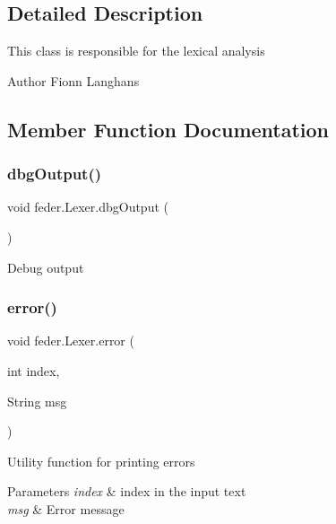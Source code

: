 \subsection{Detailed Description}
This class is responsible for the lexical analysis

\begin{DoxyAuthor}{Author}
Fionn Langhans 
\end{DoxyAuthor}


\subsection{Member Function Documentation}
\mbox{\label{classfeder_1_1Lexer_a523ea1024fa914eb932a2048f8201aa8}} 
\subsubsection{\texorpdfstring{dbg\+Output()}{dbgOutput()}}
{\footnotesize\ttfamily void feder.\+Lexer.\+dbg\+Output (\begin{DoxyParamCaption}{ }\end{DoxyParamCaption})}

Debug output \mbox{\label{classfeder_1_1Lexer_abd8b18eca822366aa2d9668b9991346b}} 
\subsubsection{\texorpdfstring{error()}{error()}}
{\footnotesize\ttfamily void feder.\+Lexer.\+error (\begin{DoxyParamCaption}\item[{int}]{index,  }\item[{String}]{msg }\end{DoxyParamCaption})}

Utility function for printing errors 
\begin{DoxyParams}{Parameters}
{\em index} & index in the input text \\
\hline
{\em msg} & Error message \\
\hline
\end{DoxyParams}
\mbox{\label{classfeder_1_1Lexer_aa2e15cfd390d162a7ccd392d19386031}} 
